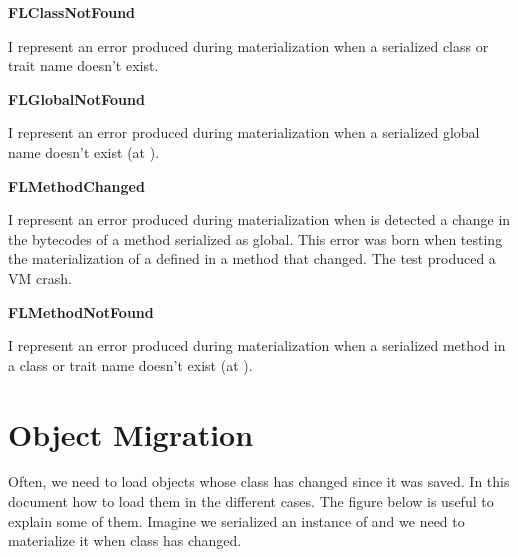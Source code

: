 \documentclass[a4paper,10pt,twoside]{book}
\begin{document}
\begin{list}{}{}
\item\hspace{-\labelwidth}\textbf{ FLClassNotFound}
\item  I represent an error produced during materialization when a serialized class or trait name doesn't exist.
\end{list}

\begin{list}{}{}
\item\hspace{-\labelwidth}\textbf{ FLGlobalNotFound}
\item  I represent an error produced during materialization when a serialized global name doesn't exist (at ).
\end{list}

\begin{list}{}{}
\item\hspace{-\labelwidth}\textbf{ FLMethodChanged}
\item  I represent an error produced during materialization when is detected a change in the bytecodes of a method serialized as global. This error was born when testing the materialization of a  defined in a method that changed. The test produced a VM crash.
\end{list}

\begin{list}{}{}
\item\hspace{-\labelwidth}\textbf{ FLMethodNotFound}
\item  I represent an error produced during materialization when a serialized method in a class or trait name doesn't exist (at ).
\end{list}



\section{Object Migration}

Often, we need to load objects whose class has changed since it was saved. In this document how to load them in the different cases. The figure below is useful to explain some of them. Imagine we serialized an instance of  and we need to materialize it when  class has changed.
\end{document}
